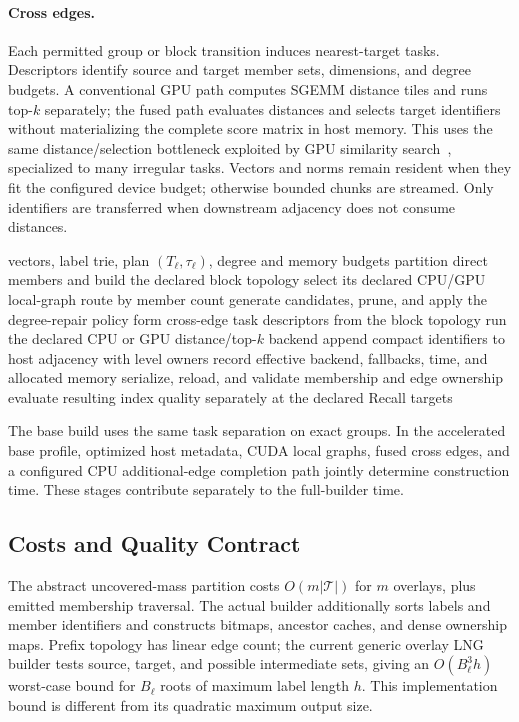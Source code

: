 \paragraph{Cross edges.}
Each permitted group or block transition induces nearest-target tasks.
Descriptors identify source and target member sets, dimensions, and degree
budgets.  A conventional GPU path computes SGEMM distance tiles and runs
top-$k$ separately; the fused path evaluates distances and selects target
identifiers without materializing the complete score matrix in host memory.
This uses the same distance/selection bottleneck exploited by GPU similarity
search~\cite{johnson2021gpu}, specialized to many irregular tasks.  Vectors
and norms remain resident when they fit the configured device budget;
otherwise bounded chunks are streamed.  Only identifiers are transferred
when downstream adjacency does not consume distances.

\begin{algorithm}[t]
\caption{Construction of one declared hierarchy plan}
\label{alg:gpu-build}
\begin{algorithmic}[1]
\Require vectors, label trie, plan $(T_\ell,\tau_\ell)$, degree and memory budgets
 \State partition direct members and build the declared block topology
  \State select its declared CPU/GPU local-graph route by member count
  \State generate candidates, prune, and apply the degree-repair policy
 \EndFor
 \State form cross-edge task descriptors from the block topology
  \State run the declared CPU or GPU distance/top-$k$ backend
  \State append compact identifiers to host adjacency with level owners
 \EndFor
 \State record effective backend, fallbacks, time, and allocated memory
\EndFor
\State serialize, reload, and validate membership and edge ownership
\State evaluate resulting index quality separately at the declared Recall targets
\end{algorithmic}
\end{algorithm}

The base build uses the same task separation on exact groups.  In the
accelerated base profile, optimized host metadata, CUDA local graphs, fused
cross edges, and a configured CPU additional-edge completion path jointly
determine construction time.  These stages contribute separately to the full-builder time.

\subsection{Costs and Quality Contract}
The abstract uncovered-mass partition costs $O(m|\mathcal T|)$ for $m$
overlays, plus emitted membership traversal.  The actual builder additionally
sorts labels and member identifiers and constructs bitmaps, ancestor caches,
and dense ownership maps.  Prefix topology has linear edge count; the current
generic overlay LNG builder tests source, target, and possible intermediate
sets, giving an $O(B_\ell^3 h)$ worst-case bound for $B_\ell$ roots of maximum
label length $h$.  This implementation bound is different from its quadratic
maximum output size.

